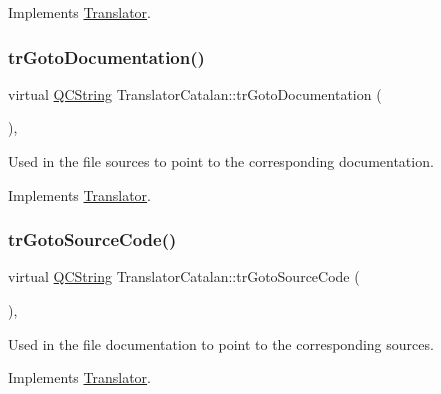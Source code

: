 Implements \mbox{\hyperlink{class_translator}{Translator}}.

\mbox{\label{class_translator_catalan_a804781105432c82ff158c4e57c4de84f}} 
\subsubsection{\texorpdfstring{trGotoDocumentation()}{trGotoDocumentation()}}
{\footnotesize\ttfamily virtual \mbox{\hyperlink{class_q_c_string}{Q\+C\+String}} Translator\+Catalan\+::tr\+Goto\+Documentation (\begin{DoxyParamCaption}{ }\end{DoxyParamCaption})\hspace{0.3cm}{\ttfamily [inline]}, {\ttfamily [virtual]}}

Used in the file sources to point to the corresponding documentation. 

Implements \mbox{\hyperlink{class_translator}{Translator}}.

\mbox{\label{class_translator_catalan_a561edcb7bb0b88d828cb464ade2914a4}} 
\subsubsection{\texorpdfstring{trGotoSourceCode()}{trGotoSourceCode()}}
{\footnotesize\ttfamily virtual \mbox{\hyperlink{class_q_c_string}{Q\+C\+String}} Translator\+Catalan\+::tr\+Goto\+Source\+Code (\begin{DoxyParamCaption}{ }\end{DoxyParamCaption})\hspace{0.3cm}{\ttfamily [inline]}, {\ttfamily [virtual]}}

Used in the file documentation to point to the corresponding sources. 

Implements \mbox{\hyperlink{class_translator}{Translator}}.

\mbox{\label{class_translator_catalan_a5cb5588922d586fc4ad07e24a8141d7e}} 
